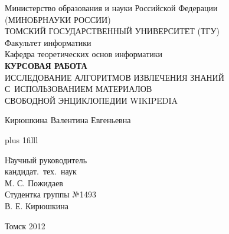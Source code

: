 
\thispagestyle{empty}
\vspace{4cm}
\begin{center}

Министерство образования и науки Российской Федерации\\
(МИНОБРНАУКИ РОССИИ)\\
ТОМСКИЙ ГОСУДАРСТВЕННЫЙ УНИВЕРСИТЕТ (ТГУ)\\
Факультет информатики\\
Кафедра теоретических основ информатики\\


\vspace{5cm}
\textbf{КУРСОВАЯ РАБОТА}\\

ИССЛЕДОВАНИЕ АЛГОРИТМОВ ИЗВЛЕЧЕНИЯ ЗНАНИЙ С~ИСПОЛЬЗОВАНИЕМ МАТЕРИАЛОВ \\
СВОБОДНОЙ ЭНЦИКЛОПЕДИИ WIKIPEDIA

Кирюшкина Валентина Евгеньевна

\end{center}

\vskip 0pt plus 1filll


\begin{tabbing}

\hspace{10cm} \= Научный руководитель\\
\> кандидат.~тех.~наук\\
\> М. С. Пожидаев\\
\> Студентка группы №1493\\
\> В. Е. Кирюшкина\\

\end{tabbing}


\vspace*{1cm}

\begin{center}
Томск 2012
\end{center}
